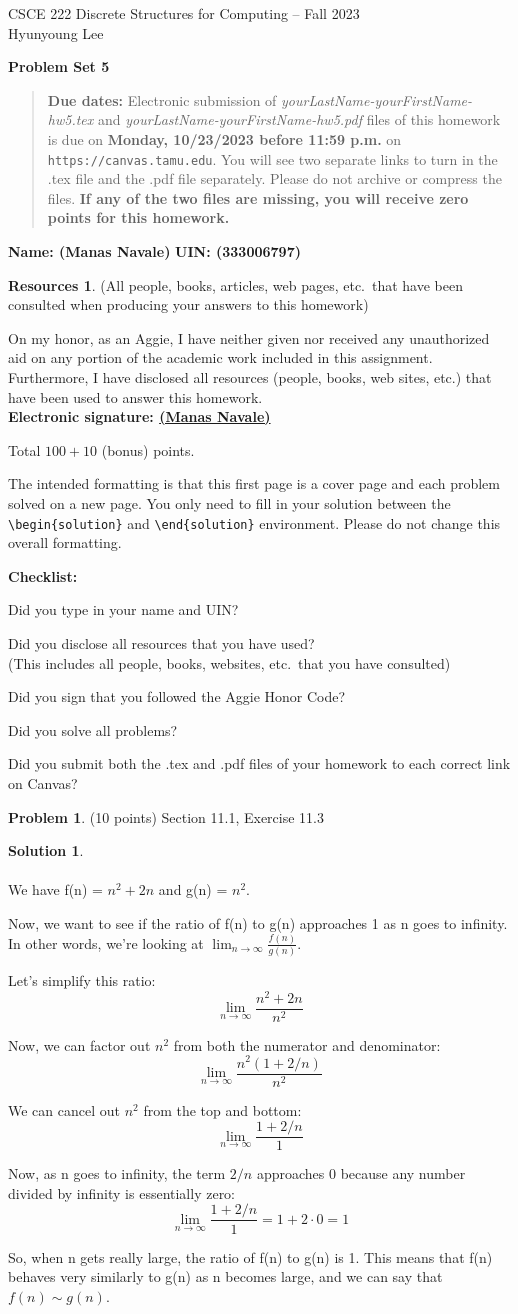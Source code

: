 \documentclass{article}
\theoremstyle{definition}
\newtheorem{problem}{Problem}
\newtheorem*{solution}{Solution}
\newtheorem*{resources}{Resources}
\newcommand{\name}[2]{\noindent\textbf{Name: #1}\hfill \textbf{UIN: #2}
  \newcommand{\myName}{#1}
  \newcommand{\myUIN}{#2}
}
\newcommand{\honor}{\noindent On my honor, as an Aggie, I have neither
  given nor received any unauthorized aid on any portion of the
  academic work included in this assignment. Furthermore, I have
  disclosed all resources (people, books, web sites, etc.) that have
  been used to answer this homework. \\[2ex]
 \textbf{Electronic signature: \underline{ (Manas Navale) } } } %
\newcommand{\checklist}{\noindent\textbf{Checklist:}
\begin{compactitem}[$\Box$] 
\item Did you type in your name and UIN? 
\item Did you disclose all resources that you have used? \\
(This includes all people, books, websites, etc.\ that you have consulted)
\item Did you sign that you followed the Aggie Honor Code? 
\item Did you solve all problems? 
\item Did you submit both the .tex and .pdf files of your homework to each correct link on Canvas? 
\end{compactitem}
}
\newcommand{\problemset}[1]{\begin{center}\textbf{Problem Set #1}\end{center}}
\newcommand{\duedate}[1]{\begin{quote}\textbf{Due dates:} Electronic
    submission of \textsl{yourLastName-yourFirstName-hw5.tex} and 
    \textsl{yourLastName-yourFirstName-hw5.pdf} files of this homework is due on
    \textbf{#1} on \texttt{https://canvas.tamu.edu}. You will see two separate links
    to turn in the .tex file and the .pdf file separately. Please do not archive or compress the files.  
    \textbf{If any of the two files are missing, you will receive zero points for this homework.}\end{quote} }
\begin{document}
\begin{center}
{\large
CSCE 222 Discrete Structures for Computing -- Fall 2023\\[.5ex]
Hyunyoung Lee\\}
\end{center}
\problemset{5}
\duedate{Monday, 10/23/2023 before 11:59 p.m.}
\name{ (Manas Navale) }{ (333006797) } %

\begin{resources} (All people, books, articles, web pages, etc.\ that
  have been consulted when producing your answers to this homework)
\end{resources}
\honor

\bigskip

\noindent
Total $100+10$ (bonus) points.

\bigskip

\noindent
The intended formatting is that this first page is a cover page and each 
problem solved on a new page. You only need to fill in your solution between 
the \verb|\begin{solution}| and \verb|\end{solution}| environment.  
Please do not change this overall formatting.

\bigskip

\vfill
\checklist

\newpage
\begin{problem} (10 points) Section 11.1, Exercise 11.3 
\end{problem}
\begin{solution}

~\\
~\\
We have f(n) = $n^2 + 2n$ and g(n) = $n^2$.

Now, we want to see if the ratio of f(n) to g(n) approaches 1 as n goes to infinity. In other words, we're looking at $\lim_{n\to\infty} \frac{f(n)}{g(n)}$.

Let's simplify this ratio:
\[
\lim_{n\to\infty} \frac{n^2 + 2n}{n^2}
\]

Now, we can factor out $n^2$ from both the numerator and denominator:
\[
\lim_{n\to\infty} \frac{n^2(1 + 2/n)}{n^2}
\]

We can cancel out $n^2$ from the top and bottom:
\[
\lim_{n\to\infty} \frac{1 + 2/n}{1}
\]

Now, as n goes to infinity, the term $2/n$ approaches 0 because any number divided by infinity is essentially zero:
\[
\lim_{n\to\infty} \frac{1 + 2/n}{1} = 1 + 2 \cdot 0 = 1
\]

So, when n gets really large, the ratio of f(n) to g(n) is 1. This means that f(n) behaves very similarly to g(n) as n becomes large, and we can say that $f(n) \sim g(n)$.
\end{solution}
\end{document}

